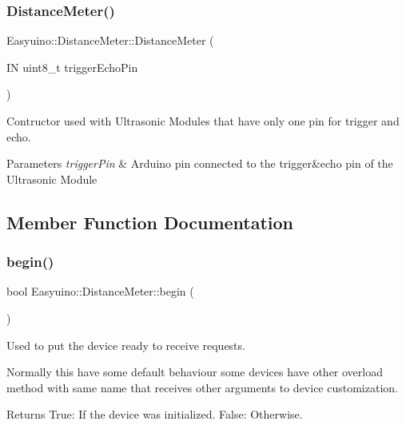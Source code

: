 \subsubsection{\texorpdfstring{Distance\+Meter()}{DistanceMeter()}\hspace{0.1cm}{\footnotesize\ttfamily [2/2]}}
{\footnotesize\ttfamily Easyuino\+::\+Distance\+Meter\+::\+Distance\+Meter (\begin{DoxyParamCaption}\item[{IN uint8\+\_\+t}]{trigger\+Echo\+Pin }\end{DoxyParamCaption})}



Contructor used with Ultrasonic Modules that have only one pin for trigger and echo. 


\begin{DoxyParams}{Parameters}
{\em trigger\+Pin} & Arduino pin connected to the trigger\&echo pin of the Ultrasonic Module \\
\hline
\end{DoxyParams}


\subsection{Member Function Documentation}
\mbox{\label{class_easyuino_1_1_distance_meter_a0374e6f806cd71f0f918c6ea7b7700a0}} 
\subsubsection{\texorpdfstring{begin()}{begin()}}
{\footnotesize\ttfamily bool Easyuino\+::\+Distance\+Meter\+::begin (\begin{DoxyParamCaption}{ }\end{DoxyParamCaption})\hspace{0.3cm}{\ttfamily [virtual]}}



Used to put the device ready to receive requests. 

Normally this have some default behaviour some devices have other overload method with same name that receives other arguments to device customization. \begin{DoxyReturn}{Returns}
True\+: If the device was initialized. False\+: Otherwise. 
\end{DoxyReturn}


